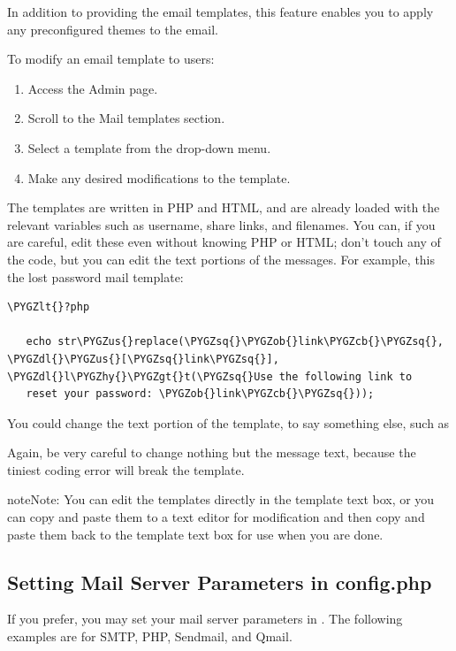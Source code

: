 \documentclass[letterpaper,10pt,english]{sphinxmanual}
\def\PYGZus{\char`\_}
\def\PYGZob{\char`\{}
\def\PYGZcb{\char`\}}
\def\PYGZlt{\char`\<}
\def\PYGZgt{\char`\>}
\def\PYGZdl{\char`\$}
\def\PYGZhy{\char`\-}
\def\PYGZsq{\char`\'}
\renewcommand\PYGZsq{\textquotesingle}
\begin{document}
In addition to providing the email templates, this feature enables you to apply
any preconfigured themes to the email.

To modify an email template to users:
\begin{enumerate}
\item {} 
Access the Admin page.

\item {} 
Scroll to the Mail templates section.

\item {} 
Select a template from the drop-down menu.

\item {} 
Make any desired modifications to the template.

\end{enumerate}

The templates are written in PHP and HTML, and are already loaded with the
relevant variables such as username, share links, and filenames. You can, if you
are careful, edit these even without knowing PHP or HTML; don't touch any of the
code, but you can edit the text portions of the messages. For example, this the
lost password mail template:

\begin{Verbatim}[commandchars=\\\{\}]
\PYGZlt{}?php

   echo str\PYGZus{}replace(\PYGZsq{}\PYGZob{}link\PYGZcb{}\PYGZsq{}, \PYGZdl{}\PYGZus{}[\PYGZsq{}link\PYGZsq{}], \PYGZdl{}l\PYGZhy{}\PYGZgt{}t(\PYGZsq{}Use the following link to
   reset your password: \PYGZob{}link\PYGZcb{}\PYGZsq{}));
\end{Verbatim}

You could change the text portion of the template,  to say something else, such as 

Again, be very careful to change nothing but the message text, because the
tiniest coding error will break the template.

\begin{notice}{note}{Note:}
You can edit the templates directly in the template text box, or you
can copy and paste them to a text editor for modification and then copy and
paste them back to the template text box for use when you are done.
\end{notice}


\subsection{Setting Mail Server Parameters in config.php}
\label{configuration_server/email_configuration:setting-mail-server-parameters-in-config-php}
If you prefer, you may set your mail server parameters in .
The following examples are for SMTP, PHP, Sendmail, and Qmail.
\end{document}
